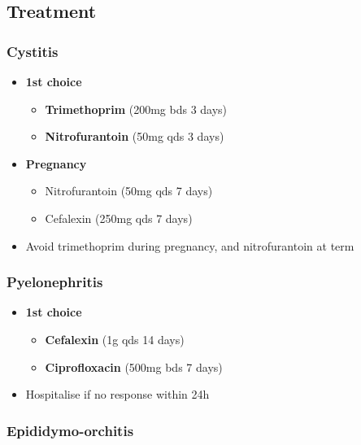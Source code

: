 \documentclass[
  12pt,
]{memoir}
\providecommand{\tightlist}{%
  \setlength{\itemsep}{0pt}\setlength{\parskip}{0pt}}
\begin{document}
\hypertarget{treatment-1}{%
\subsection{Treatment}\label{treatment-1}}

\hypertarget{cystitis}{%
\subsubsection{Cystitis}\label{cystitis}}

\begin{itemize}
\tightlist
\item
  \textbf{1st choice}

  \begin{itemize}
  \tightlist
  \item
    \textbf{Trimethoprim} (200mg bds 3 days)
  \item
    \textbf{Nitrofurantoin} (50mg qds 3 days)
  \end{itemize}
\item
  \textbf{Pregnancy}

  \begin{itemize}
  \tightlist
  \item
    Nitrofurantoin (50mg qds 7 days)
  \item
    Cefalexin (250mg qds 7 days)
  \end{itemize}
\item
  Avoid trimethoprim during pregnancy, and nitrofurantoin at term
\end{itemize}

\hypertarget{pyelonephritis}{%
\subsubsection{Pyelonephritis}\label{pyelonephritis}}

\begin{itemize}
\tightlist
\item
  \textbf{1st choice}

  \begin{itemize}
  \tightlist
  \item
    \textbf{Cefalexin} (1g qds 14 days)
  \item
    \textbf{Ciprofloxacin} (500mg bds 7 days)
  \end{itemize}
\item
  Hospitalise if no response within 24h
\end{itemize}

\hypertarget{epididymo-orchitis}{%
\subsubsection{Epididymo-orchitis}\label{epididymo-orchitis}}
\end{document}
